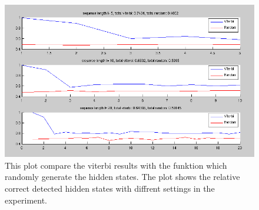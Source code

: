 \documentclass[a4paper, 12pt, titlepage]{article}
\begin{document}
\begin{figure}[h]
	\includegraphics[width=\textwidth]{images/experiment_results.png}
	\caption{This plot compare the viterbi results with the funktion which randomly generate the hidden states. The plot shows the relative correct detected hidden states with diffrent settings in the experiment. }
\end{figure}
\end{document}
